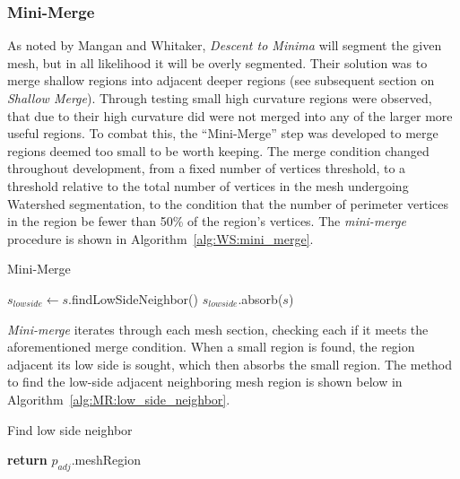 \subsubsection{Mini-Merge}
As noted by Mangan and Whitaker, \textit{Descent to Minima} will segment the given mesh, but in all likelihood it will be overly segmented.
Their solution was to merge shallow regions into adjacent deeper regions (see subsequent section on \textit{Shallow Merge}).
Through testing small high curvature regions were observed, that due to their high curvature did were not merged into any of the larger more useful regions.
To combat this, the ``Mini-Merge'' step was developed to merge regions deemed too small to be worth keeping.
The merge condition changed throughout development, from a fixed number of vertices threshold, to a threshold relative to the total number of vertices in the mesh undergoing Watershed segmentation, to the condition that the number of perimeter vertices in the region be fewer than 50\% of the region's vertices.
The \textit{mini-merge} procedure is shown in Algorithm~\ref{alg:WS:mini_merge}.

\begin{algorithm}[htb]
\caption{Mini-Merge}\label{alg:WS:mini_merge}
\begin{algorithmic}[1]
			\State $s_{lowside} \leftarrow s$.findLowSideNeighbor()
			\State $s_{lowside}$.absorb($s$)
		\EndIf
	\EndFor
\EndFunction
\end{algorithmic}
\end{algorithm}

\textit{Mini-merge} iterates through each mesh section, checking each if it meets the aforementioned merge condition.
When a small region is found, the region adjacent its low side is sought, which then absorbs the small region.
The method to find the low-side adjacent neighboring mesh region is shown below in Algorithm~\ref{alg:MR:low_side_neighbor}.

\begin{algorithm}[htb]
\caption{Find low side neighbor}\label{alg:MR:low_side_neighbor}
\begin{algorithmic}[1]
				\State \textbf{return} $p_{adj}$.meshRegion
			\EndIf
		\EndFor
	\EndFor
\EndFunction
\end{algorithmic}
\end{algorithm}

